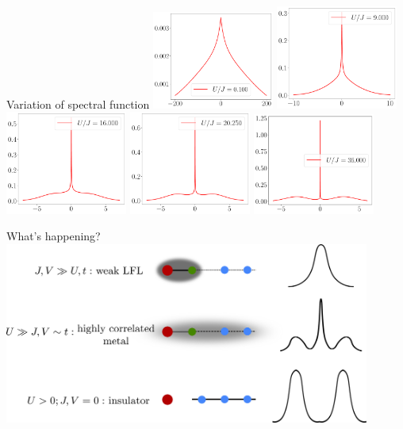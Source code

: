 \documentclass[aspectratio=169]{beamer}
\begin{document}
\begin{frame}[noframenumbering]{Variation of spectral function}
\centering
\includegraphics[width=0.3\textwidth]{figures/spec-func-gen-siam-U_by_J=0.100.pdf}
\includegraphics[width=0.3\textwidth]{figures/spec-func-gen-siam-U_by_J=9.000.pdf}
\includegraphics[width=0.3\textwidth]{figures/spec-func-gen-siam-U_by_J=16.000.pdf}
\includegraphics[width=0.3\textwidth]{figures/spec-func-gen-siam-U_by_J=20.250.pdf}
\includegraphics[width=0.3\textwidth]{figures/spec-func-gen-siam-U_by_J=36.000.pdf}
\end{frame}

\begin{frame}[noframenumbering]{What's happening?}
\includegraphics[width=0.9\textwidth]{figures/sc-lm.pdf}
\end{frame}
\end{document}
